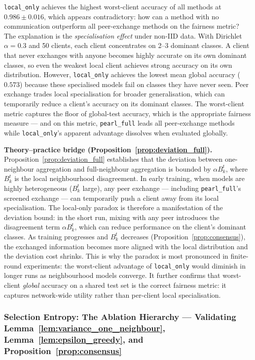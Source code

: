 \documentclass[conference]{IEEEtran}
\begin{document}
\texttt{local\_only} achieves the highest worst-client accuracy of all methods at $0.986\pm0.016$, which appears contradictory: how can a method with no communication outperform all peer-exchange methods on the fairness metric? The explanation is the \emph{specialisation effect} under non-IID data. With Dirichlet $\alpha=0.3$ and 50 clients, each client concentrates on 2--3 dominant classes. A client that never exchanges with anyone becomes highly accurate on its own dominant classes, so even the weakest local client achieves strong accuracy on its own distribution. However, \texttt{local\_only} achieves the lowest mean global accuracy ($0.573$) because these specialised models fail on classes they have never seen. Peer exchange trades local specialisation for broader generalisation, which can temporarily reduce a client's accuracy on its dominant classes. The worst-client metric captures the floor of global-test accuracy, which is the appropriate fairness measure --- and on this metric, \texttt{pearl\_full} leads all peer-exchange methods while \texttt{local\_only}'s apparent advantage dissolves when evaluated globally.

\textbf{Theory--practice bridge (Proposition~\ref{prop:deviation_full}).}
Proposition~\ref{prop:deviation_full} establishes that the deviation between one-neighbour aggregation and full-neighbour aggregation is bounded by $\alpha B_k^t$, where $B_k^t$ is the local neighbourhood disagreement. In early training, when models are highly heterogeneous ($B_k^t$ large), any peer exchange --- including \texttt{pearl\_full}'s screened exchange --- can temporarily push a client away from its local specialisation. The local-only paradox is therefore a manifestation of the deviation bound: in the short run, mixing with any peer introduces the disagreement term $\alpha B_k^t$, which can reduce performance on the client's dominant classes. As training progresses and $B_k^t$ decreases (Proposition~\ref{prop:consensus}), the exchanged information becomes more aligned with the local distribution and the deviation cost shrinks. This is why the paradox is most pronounced in finite-round experiments: the worst-client advantage of \texttt{local\_only} would diminish in longer runs as neighbourhood models converge. It further confirms that worst-client \emph{global} accuracy on a shared test set is the correct fairness metric: it captures network-wide utility rather than per-client local specialisation.

\subsubsection{Selection Entropy: The Ablation Hierarchy — Validating Lemma~\ref{lem:variance_one_neighbour}, Lemma~\ref{lem:epsilon_greedy}, and Proposition~\ref{prop:consensus}}
\label{subsubsec:official-entropy}
\end{document}
